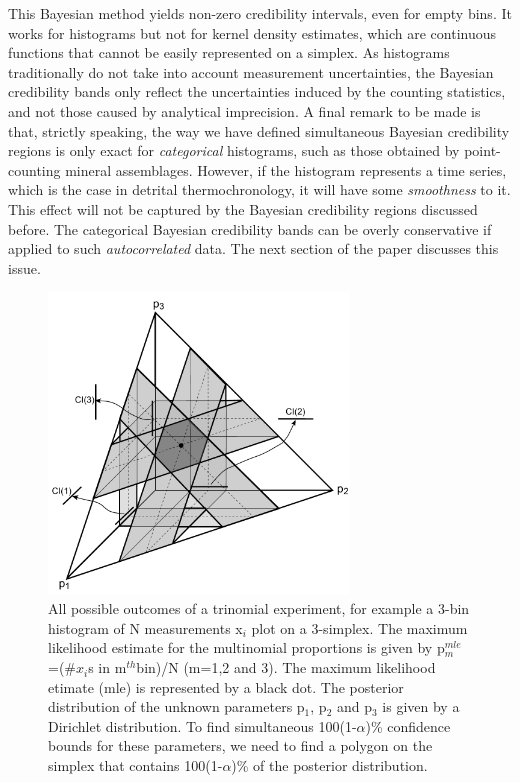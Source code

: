 \documentclass{article}
\begin{document}
This Bayesian  method yields non-zero credibility  intervals, even for
empty  bins.  It  works  for  histograms but  not  for kernel  density
estimates,  which  are  continuous  functions that  cannot  be  easily
represented  on a simplex.   As histograms  traditionally do  not take
into account measurement uncertainties, the Bayesian credibility bands
only reflect the uncertainties induced by the counting statistics, and
not those caused by analytical  imprecision. A final remark to be made
is  that, strictly  speaking,  the way  we  have defined  simultaneous
Bayesian  credibility  regions is  only  exact  for {\it  categorical}
histograms,   such  as  those   obtained  by   point-counting  mineral
assemblages.   However, if  the  histogram represents  a time  series,
which is the case in detrital thermochronology, it will have some {\it
smoothness} to it.   This effect will not be  captured by the Bayesian
credibility  regions  discussed   before.   The  categorical  Bayesian
credibility bands can  be overly conservative if applied  to such {\it
autocorrelated} data.   The next section  of the paper  discusses this
issue.

\begin{figure}[here]
  \centering
  \label{fig:simplex}
  \includegraphics[width=8cm]{6.pdf}
  \caption{
All possible outcomes  of a trinomial experiment, for  example a 3-bin
histogram of  N measurements x$_i$  plot on a 3-simplex.   The maximum
likelihood  estimate  for  the  multinomial proportions  is  given  by
p$_m^{mle}$=(\#$x_i$s in m$^{{th}}$bin)/N  (m=1,2 and 3).  The maximum
likelihood etimate (mle) is represented by a black dot.  The posterior
distribution of the unknown parameters p$_1$, p$_2$ and p$_3$ is given
by a  Dirichlet distribution.  To  find simultaneous 100(1-$\alpha$)\%
confidence bounds for  these parameters, we need to  find a polygon on
the   simplex  that  contains   100(1-$\alpha$)\%  of   the  posterior
distribution.}
\end{figure}
\end{document}
